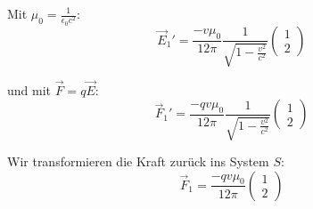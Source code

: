 \documentclass[a4paper,german,12pt,smallheadings]{scrartcl}
\begin{document}
Mit $\mu_0 = \frac{1}{\epsilon_0 c^2}$:
\begin{equation}
  \vec{E}_1'
  = \frac{-v \mu_0}{12 \pi} \frac{1}{\sqrt{1 - \frac{v^2}{c^2}}} \begin{pmatrix} 1 \\ 2 \end{pmatrix}
\end{equation}

und mit $\vec{F} = q\vec{E}$:
\begin{equation}
  \vec{F}_1'
  = \frac{-qv \mu_0}{12 \pi} \frac{1}{\sqrt{1 - \frac{v^2}{c^2}}} \begin{pmatrix} 1 \\ 2 \end{pmatrix}
\end{equation}

Wir transformieren die Kraft zurück ins System $S$:
\begin{equation}
  \vec{F}_1
  = \frac{-qv \mu_0}{12 \pi} \begin{pmatrix} 1 \\ 2 \end{pmatrix}
\end{equation}

\end{document}
